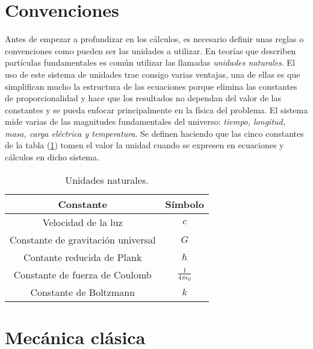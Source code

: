 \section{Convenciones}
\label{cap1:sec:Convenciones}

Antes de empezar a profundizar en los cálculos, es necesario definir unas reglas o convenciones como pueden ser las unidades a utilizar. En teorías que describen partículas fundamentales es común utilizar las llamadas \textit{unidades naturales}. 
El uso de este sistema de unidades trae consigo varias ventajas, una de ellas es que simplifican mucho la estructura de las ecuaciones porque elimina las constantes de proporcionalidad y hace que los resultados no dependan del valor de las constantes y se pueda enfocar principalmente en la física del problema.
El sistema mide varias de las magnitudes fundamentales del universo: \textit{tiempo, longitud, masa, carga eléctrica y temperatura}. Se definen haciendo que las cinco constantes de la tabla (\ref{tabla1:Unidades naturales}) tomen el valor la unidad cuando se expresen en ecuaciones y cálculos en dicho sistema.

\begin{table}[h]
\centering    
    \begin{tabular}{| c | c |}
        \hline
        Constante & Símbolo \\
        \hline
        Velocidad de la luz & $c$ \\
        \hline
        Constante de gravitación universal  & $G$ \\
        \hline
        Contante reducida de Plank & $\hbar$ \\
        \hline
        Constante de fuerza de Coulomb & $\frac{1}{4\pi\epsilon_0}$ \\
        \hline
        Constante de Boltzmann & $k$ \\
        \hline
    \end{tabular}
\caption{Unidades naturales.}
\label{tabla1:Unidades naturales}
\end{table}



\section{Mecánica clásica}
\label{cap2:sec:Mecanica clasica}


